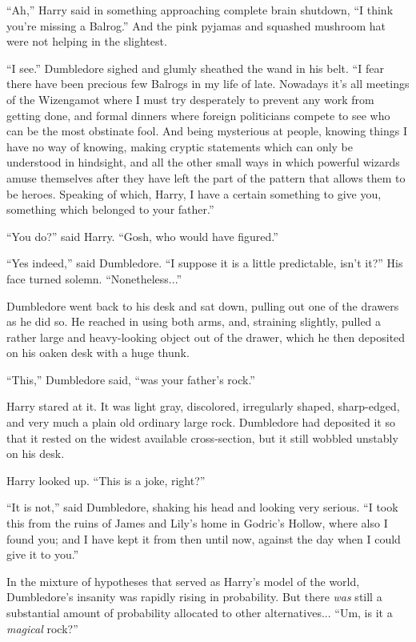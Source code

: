``Ah,'' Harry said in something approaching complete brain shutdown, ``I think you're missing a Balrog.'' And the pink pyjamas and squashed mushroom hat were not helping in the slightest.

``I see.'' Dumbledore sighed and glumly sheathed the wand in his belt. ``I fear there have been precious few Balrogs in my life of late. Nowadays it's all meetings of the Wizengamot where I must try desperately to prevent any work from getting done, and formal dinners where foreign politicians compete to see who can be the most obstinate fool. And being mysterious at people, knowing things I have no way of knowing, making cryptic statements which can only be understood in hindsight, and all the other small ways in which powerful wizards amuse themselves after they have left the part of the pattern that allows them to be heroes. Speaking of which, Harry, I have a certain something to give you, something which belonged to your father.''

``You do?'' said Harry. ``Gosh, who would have figured.''

``Yes indeed,'' said Dumbledore. ``I suppose it is a little predictable, isn't it?'' His face turned solemn. ``Nonetheless...''

Dumbledore went back to his desk and sat down, pulling out one of the drawers as he did so. He reached in using both arms, and, straining slightly, pulled a rather large and heavy-looking object out of the drawer, which he then deposited on his oaken desk with a huge thunk.

``This,'' Dumbledore said, ``was your father's rock.''

Harry stared at it. It was light gray, discolored, irregularly shaped, sharp-edged, and very much a plain old ordinary large rock. Dumbledore had deposited it so that it rested on the widest available cross-section, but it still wobbled unstably on his desk.

Harry looked up. ``This is a joke, right?''

``It is not,'' said Dumbledore, shaking his head and looking very serious. ``I took this from the ruins of James and Lily's home in Godric's Hollow, where also I found you; and I have kept it from then until now, against the day when I could give it to you.''

In the mixture of hypotheses that served as Harry's model of the world, Dumbledore's insanity was rapidly rising in probability. But there \emph{was} still a substantial amount of probability allocated to other alternatives... ``Um, is it a \emph{magical} rock?''

